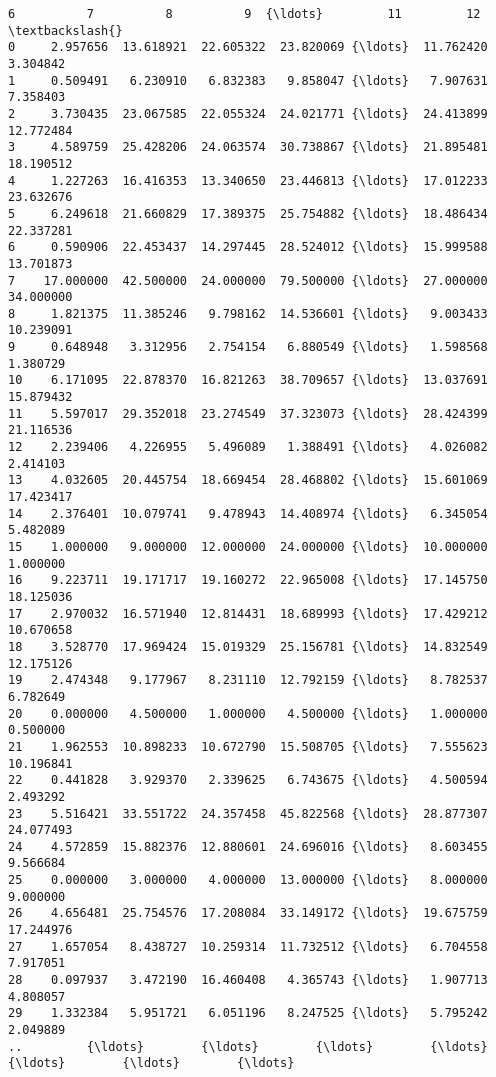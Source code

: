 \documentclass[11pt]{article}
\begin{document}
\begin{Verbatim}[commandchars=\\\{\}]
            6          7          8          9  {\ldots}         11         12  \textbackslash{}
0     2.957656  13.618921  22.605322  23.820069 {\ldots}  11.762420   3.304842   
1     0.509491   6.230910   6.832383   9.858047 {\ldots}   7.907631   7.358403   
2     3.730435  23.067585  22.055324  24.021771 {\ldots}  24.413899  12.772484   
3     4.589759  25.428206  24.063574  30.738867 {\ldots}  21.895481  18.190512   
4     1.227263  16.416353  13.340650  23.446813 {\ldots}  17.012233  23.632676   
5     6.249618  21.660829  17.389375  25.754882 {\ldots}  18.486434  22.337281   
6     0.590906  22.453437  14.297445  28.524012 {\ldots}  15.999588  13.701873   
7    17.000000  42.500000  24.000000  79.500000 {\ldots}  27.000000  34.000000   
8     1.821375  11.385246   9.798162  14.536601 {\ldots}   9.003433  10.239091   
9     0.648948   3.312956   2.754154   6.880549 {\ldots}   1.598568   1.380729   
10    6.171095  22.878370  16.821263  38.709657 {\ldots}  13.037691  15.879432   
11    5.597017  29.352018  23.274549  37.323073 {\ldots}  28.424399  21.116536   
12    2.239406   4.226955   5.496089   1.388491 {\ldots}   4.026082   2.414103   
13    4.032605  20.445754  18.669454  28.468802 {\ldots}  15.601069  17.423417   
14    2.376401  10.079741   9.478943  14.408974 {\ldots}   6.345054   5.482089   
15    1.000000   9.000000  12.000000  24.000000 {\ldots}  10.000000   1.000000   
16    9.223711  19.171717  19.160272  22.965008 {\ldots}  17.145750  18.125036   
17    2.970032  16.571940  12.814431  18.689993 {\ldots}  17.429212  10.670658   
18    3.528770  17.969424  15.019329  25.156781 {\ldots}  14.832549  12.175126   
19    2.474348   9.177967   8.231110  12.792159 {\ldots}   8.782537   6.782649   
20    0.000000   4.500000   1.000000   4.500000 {\ldots}   1.000000   0.500000   
21    1.962553  10.898233  10.672790  15.508705 {\ldots}   7.555623  10.196841   
22    0.441828   3.929370   2.339625   6.743675 {\ldots}   4.500594   2.493292   
23    5.516421  33.551722  24.357458  45.822568 {\ldots}  28.877307  24.077493   
24    4.572859  15.882376  12.880601  24.696016 {\ldots}   8.603455   9.566684   
25    0.000000   3.000000   4.000000  13.000000 {\ldots}   8.000000   9.000000   
26    4.656481  25.754576  17.208084  33.149172 {\ldots}  19.675759  17.244976   
27    1.657054   8.438727  10.259314  11.732512 {\ldots}   6.704558   7.917051   
28    0.097937   3.472190  16.460408   4.365743 {\ldots}   1.907713   4.808057   
29    1.332384   5.951721   6.051196   8.247525 {\ldots}   5.795242   2.049889   
..         {\ldots}        {\ldots}        {\ldots}        {\ldots} {\ldots}        {\ldots}        {\ldots}   

\end{Verbatim}
\end{document}
